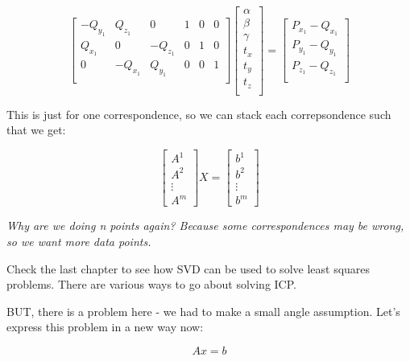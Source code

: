 \begin{equation}
    \begin{bmatrix}
    -Q_{y_1} & Q_{z_1} & 0 & 1 & 0 & 0 \\
    Q_{x_1} & 0 & -Q_{z_1} & 0 & 1 & 0 \\
    0 & - Q_{x_1} & Q_{y_1} & 0 & 0 & 1 \\
    \end{bmatrix} \begin{bmatrix}
    \alpha \\
    \beta \\
    \gamma \\
    t_x \\
    t_y \\
    t_z \\
    \end{bmatrix} = \begin{bmatrix}
    P_{x_1} - Q_{x_1} \\
    P_{y_1} - Q_{y_1} \\
    P_{z_1} - Q_{z_1} \\
    \end{bmatrix}
\end{equation}

This is just for one correspondence, so we can stack each correpsondence such that we get:

\begin{equation}
    \begin{bmatrix}
    A^1 \\
    A^2 \\
    \vdots \\
    A^m
    \end{bmatrix} X = \begin{bmatrix}
    b^1 \\
    b^2 \\
    \vdots \\
    b^m
    \end{bmatrix}
\end{equation}

\textit{Why are we doing n points again? Because some correspondences may be wrong, so we want more data points.}

Check the last chapter to see how SVD can be used to solve least squares problems. There are various ways to go about solving ICP.

BUT, there is a problem here - we had to make a small angle assumption. Let's express this problem in a new way now:

\begin{equation*}
    Ax = b
\end{equation*}

